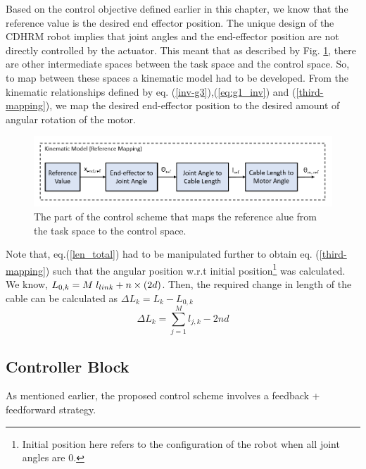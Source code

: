 \documentclass[a4paper,12pt]{report}
\begin{document}
Based on the control objective defined earlier in this chapter, we know that the reference value is the desired end effector position. The unique design of the CDHRM robot implies that joint angles and the end-effector position are not directly controlled by the actuator. This meant that as described by Fig. \ref{reference-mapping}, there are other intermediate spaces between the task space and the control space. So, to map between these spaces a kinematic model had to be developed. From the kinematic relationships defined by eq. (\ref{inv-g3}),(\ref{eq:g1_inv}) and (\ref{third-mapping}), we map the desired end-effector position to the desired amount of angular rotation of the motor.
\begin{figure}[H]
	\includegraphics[width=\textwidth]{images/reference-mapping.png}
	\caption{The part of the control scheme that maps the reference alue from the task space to the control space.}
	\label{reference-mapping}
\end{figure}

Note that, eq.(\ref{len_total}) had to be manipulated further to obtain eq. (\ref{third-mapping}) such that the angular position w.r.t initial position\footnote{Initial position here refers to the configuration of the robot when all joint angles are 0.} was calculated. We know, $ L_{0,k} = M\hspace{1mm}l_{link} + n \times (2d) $. Then, the required change in length of the cable can be calculated as $ \Delta L_k = L_k - L_{0,k} $
\begin{equation}
\label{third-mapping}
\Delta L_k = \sum_{j=1}^{M}l_{j,k} - 2nd
\end{equation}


\subsection{Controller Block}

As mentioned earlier, the proposed control scheme involves a feedback + feedforward strategy. 
\end{document}
